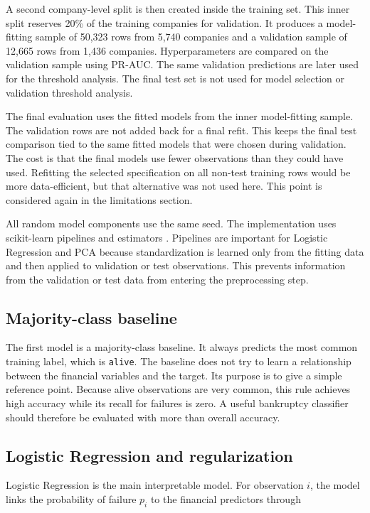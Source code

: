 \documentclass[11pt,a4paper]{article}
\begin{document}
A second company-level split is then created inside the training set. This
inner split reserves 20\% of the training companies for validation. It produces
a model-fitting sample of 50,323 rows from 5,740 companies and a validation
sample of 12,665 rows from 1,436 companies. Hyperparameters are compared on the
validation sample using PR-AUC. The same validation predictions are later used
for the threshold analysis. The final test set is not used for model selection
or validation threshold analysis.

The final evaluation uses the fitted models from the inner model-fitting sample.
The validation rows are not added back for a final refit. This keeps the final
test comparison tied to the same fitted models that were chosen during
validation. The cost is that the final models use fewer observations than they
could have used. Refitting the selected specification on all non-test training
rows would be more data-efficient, but that alternative was not used here. This
point is considered again in the limitations section.

All random model components use the same seed. The implementation uses
scikit-learn pipelines and estimators \citep{pedregosa2011}. Pipelines are
important for Logistic Regression and PCA because standardization is learned
only from the fitting data and then applied to validation or test observations.
This prevents information from the validation or test data from entering the
preprocessing step.

\subsection{Majority-class baseline}

The first model is a majority-class baseline. It always predicts the most common
training label, which is \texttt{alive}. The baseline does not try to learn a
relationship between the financial variables and the target. Its purpose is to
give a simple reference point. Because alive observations are very common, this
rule achieves high accuracy while its recall for failures is zero. A useful
bankruptcy classifier should therefore be evaluated with more than overall
accuracy.

\subsection{Logistic Regression and regularization}

Logistic Regression is the main interpretable model. For observation $i$, the
model links the probability of failure $p_i$ to the financial predictors through
\end{document}
